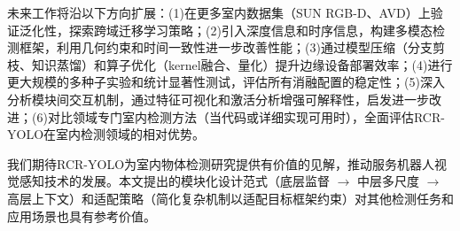 \documentclass[journal]{IEEEtran}
\begin{document}
未来工作将沿以下方向扩展：(1)在更多室内数据集（SUN RGB-D、AVD）上验证泛化性，探索跨域迁移学习策略；(2)引入深度信息和时序信息，构建多模态检测框架，利用几何约束和时间一致性进一步改善性能；(3)通过模型压缩（分支剪枝、知识蒸馏）和算子优化（kernel融合、量化）提升边缘设备部署效率；(4)进行更大规模的多种子实验和统计显著性测试，评估所有消融配置的稳定性；(5)深入分析模块间交互机制，通过特征可视化和激活分析增强可解释性，启发进一步改进；(6)对比领域专门室内检测方法（当代码或详细实现可用时），全面评估RCR-YOLO在室内检测领域的相对优势。

我们期待RCR-YOLO为室内物体检测研究提供有价值的见解，推动服务机器人视觉感知技术的发展。本文提出的模块化设计范式（底层监督 $\rightarrow$ 中层多尺度 $\rightarrow$ 高层上下文）和适配策略（简化复杂机制以适配目标框架约束）对其他检测任务和应用场景也具有参考价值。




\end{document}
